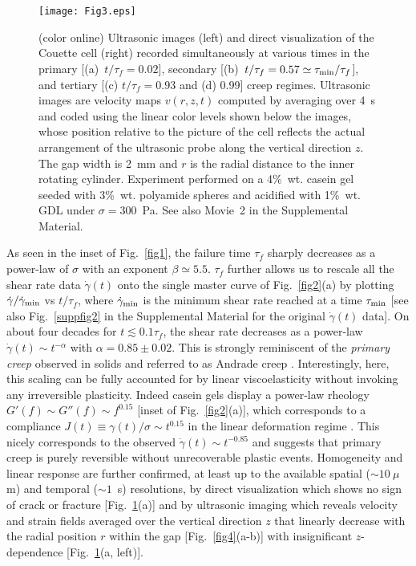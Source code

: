\documentclass[twocolumn,superscriptaddress,showpacs,preprintnumbers,amsmath,amssymb,prl]{revtex4}
\newcommand\gp{\dot\gamma}
\newcommand\taum{\tau_{\rm min}}
\begin{document}
\begin{figure}[t]
\centering
\texttt{[image: Fig3.eps]}
\caption{(color online) Ultrasonic images (left) and direct visualization of the Couette cell (right) recorded simultaneously at various times in the primary [(a)~$t/\tau_f=0.02$], secondary [(b)~$t/\tau_f=0.57\simeq\taum/\tau_f$], and tertiary  [(c) $t/\tau_f=0.93$ and (d) 0.99] creep regimes. Ultrasonic images are velocity maps $v(r,z,t)$ computed by averaging over 4~s and coded using the linear color levels shown below the images, whose position relative to the picture of the cell reflects the actual arrangement of the ultrasonic probe along the vertical direction $z$. The gap width is 2~mm and $r$ is the radial distance to the inner rotating cylinder. Experiment performed on a 4\%~wt. casein gel seeded with 3\%~wt. polyamide spheres and acidified with 1\%~wt. GDL under $\sigma=300$~Pa. See also Movie~2 in the Supplemental Material.
\label{fig3}}
\end{figure} 

As seen in the inset of Fig.~\ref{fig1}, the failure time $\tau_f$ sharply decreases as a power-law of $\sigma$ with an exponent $\beta\simeq 5.5$. $\tau_f$ further allows us to rescale all the shear rate data $\gp(t)$ onto the single master curve of Fig.~\ref{fig2}(a) by plotting $\gp/\gp_{\rm min}$ vs $t/\tau_f$, where $\gp_{\rm min}$ is the minimum shear rate reached at a time $\tau_{\rm min}$ [see also Fig.~\ref{suppfig2} in the Supplemental Material for the original $\gp(t)$ data]. On about four decades for $t\lesssim 0.1\tau_f$, the shear rate decreases as a power-law $\gp(t)\sim t^{-\alpha}$ with $\alpha=0.85\pm 0.02$. This is strongly reminiscent of the {\it primary creep} observed in solids and referred to as Andrade creep \cite{Andrade:1910,Miguel:2002,Nechad:2005}. Interestingly, here, this scaling can be fully accounted for by linear viscoelasticity without invoking any irreversible plasticity. Indeed casein gels display a power-law rheology $G'(f)\sim G''(f)\sim f^{0.15}$ [inset of Fig.~\ref{fig2}(a)], which corresponds to a compliance $J(t)\equiv\gamma(t)/\sigma\sim t^{0.15}$ in the linear deformation regime \cite{Jaishankar:2013}. This nicely corresponds to the observed $\gp(t)\sim t^{-0.85}$ and suggests that primary creep is purely reversible without unrecoverable plastic events. Homogeneity and linear response are further confirmed, at least up to the available spatial ($\sim 10~\mu$m) and temporal ($\sim 1$~s) resolutions, by direct visualization which shows no sign of crack or fracture [Fig.~\ref{fig3}(a)] and by ultrasonic imaging which reveals velocity and strain fields averaged over the vertical direction $z$ that linearly decrease with the radial position $r$ within the gap [Fig.~\ref{fig4}(a-b)] with insignificant $z$-dependence [Fig.~\ref{fig3}(a, left)].
\end{document}
